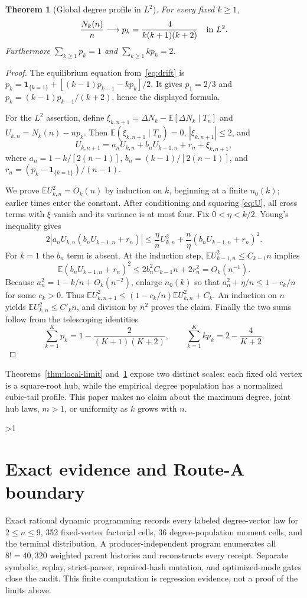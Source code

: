 \documentclass[9pt]{extarticle}
\newtheorem{theorem}{Theorem}
\newcommand{\E}{\mathbb E}
\newcommand{\1}{\mathbf 1}
\begin{document}
\begin{theorem}[Global degree profile in $L^2$]\label{thm:profile}
For every fixed $k\geq1$,
\[
 \frac{N_k(n)}n\longrightarrow p_k=\frac4{k(k+1)(k+2)}
 \quad\hbox{in }L^2.
\]
Furthermore $\sum_{k\geq1}p_k=1$ and $\sum_{k\geq1}kp_k=2$.
\end{theorem}
\begin{proof}
The equilibrium equation from~\eqref{eq:drift} is
$p_k=\1_{\{k=1\}}+[(k-1)p_{k-1}-kp_k]/2$.  It gives $p_1=2/3$ and
$p_k=(k-1)p_{k-1}/(k+2)$, hence the displayed formula.

For the $L^2$ assertion, define
$\xi_{k,n+1}=\Delta N_k-\E[\Delta N_k\mid T_n]$ and
$U_{k,n}=N_k(n)-np_k$.  Then $\E(\xi_{k,n+1}\mid T_n)=0$,
$|\xi_{k,n+1}|\leq2$, and
\begin{equation}\label{eq:U}
 U_{k,n+1}=a_nU_{k,n}+b_nU_{k-1,n}+r_n+\xi_{k,n+1},
\end{equation}
where $a_n=1-k/[2(n-1)]$, $b_n=(k-1)/[2(n-1)]$, and
$r_n=(p_k-\1_{\{k=1\}})/(n-1)$.

We prove $\E U_{k,n}^2=O_k(n)$ by induction on $k$, beginning at a finite
$n_0(k)$; earlier times enter the constant.  After conditioning and squaring
\eqref{eq:U}, all cross terms with $\xi$ vanish and its variance is at most
four.  Fix $0<\eta<k/2$.  Young's inequality gives
\[
 2|a_nU_{k,n}(b_nU_{k-1,n}+r_n)|
 \leq \frac{\eta}{n}U_{k,n}^2+\frac{n}{\eta}
       (b_nU_{k-1,n}+r_n)^2.
\]
For $k=1$ the $b_n$ term is absent.  At the induction step,
$\E U_{k-1,n}^2\leq C_{k-1}n$ implies
\[
 \E(b_nU_{k-1,n}+r_n)^2
 \leq2b_n^2C_{k-1}n+2r_n^2=O_k(n^{-1}).
\]
Because $a_n^2=1-k/n+O_k(n^{-2})$, enlarge $n_0(k)$ so that
$a_n^2+\eta/n\leq1-c_k/n$ for some $c_k>0$.  Thus
$\E U_{k,n+1}^2\leq(1-c_k/n)\E U_{k,n}^2+C_k$.
An induction on $n$ yields $\E U_{k,n}^2\leq C'_kn$, and division by $n^2$
proves the claim.  Finally the two sums follow from the telescoping identities
\[
 \sum_{k=1}^Kp_k=1-\frac2{(K+1)(K+2)},\qquad
 \sum_{k=1}^Kkp_k=2-\frac4{K+2}.
\]
\end{proof}

Theorems~\ref{thm:local-limit} and~\ref{thm:profile} expose two distinct
scales: each fixed old vertex is a square-root hub, while the empirical
degree population has a normalized cubic-tail profile.  This paper makes no
claim about the maximum degree, joint hub laws, $m>1$, or uniformity as $k$
grows with $n$.
\fi

\ifnum\CRevisionRound>1
\section{Exact evidence and Route-A boundary}
Exact rational dynamic programming records every labeled degree-vector law
for $2\leq n\leq9$, 352 fixed-vertex factorial cells, 36 degree-population
moment cells, and the terminal distribution.  A producer-independent program
enumerates all $8!=40{,}320$ weighted parent histories and reconstructs every
receipt.  Separate symbolic, replay, strict-parser, repaired-hash mutation,
and optimized-mode gates close the audit.  This finite computation is
regression evidence, not a proof of the limits above.
\end{document}
